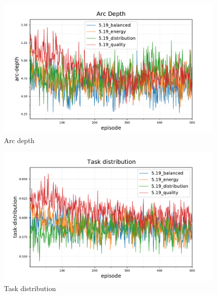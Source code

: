 \begin{figure}[ht]
	\centering
	\includegraphics[width=0.7\linewidth]{5_ctv-arc-depth}
	\captionsetup{labelfont=bf,singlelinecheck=on}
	\caption{Arc depth}
	\label{fig:5_ctv-arc-depth}
\end{figure}
\begin{figure}[ht]
	\centering
	\includegraphics[width=0.7\linewidth]{5_ctv-task-distribution}
	\captionsetup{labelfont=bf,singlelinecheck=on}
	\caption{Task distribution}
	\label{fig:5_ctv-task-distribution}
\end{figure}
